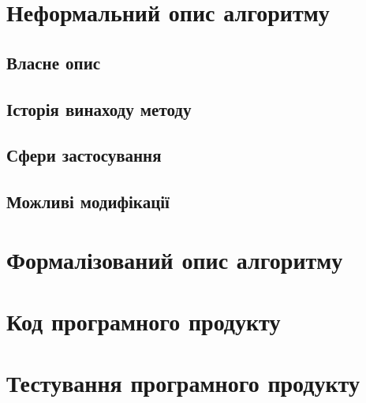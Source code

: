 \documentclass[a4paper, 12pt]{article}
\author{Скибицький Нікіта}
\date{\today}
\numberwithin{equation}{section}
\begin{document}

\people

\tableofcontents

\section{Неформальний опис алгоритму}

\subsection{Власне опис}

\subsection{Історія винаходу методу}

\subsection{Сфери застосування}

\subsection{Можливі модифікації}

\section{Формалізований опис алгоритму}

\section{Код програмного продукту}

\section{Тестування програмного продукту}

\newpage


\end{document}
